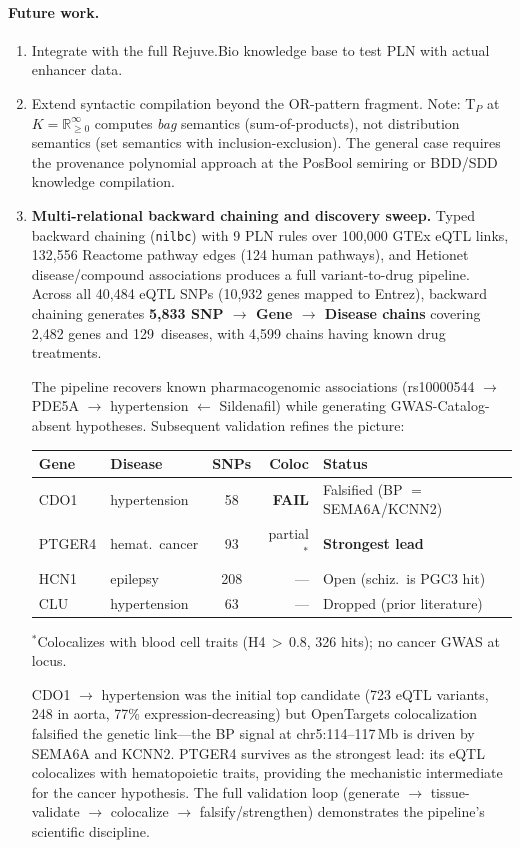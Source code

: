 \documentclass[]{article}
\newcommand{\code}[1]{\texttt{#1}}
\begin{document}
\paragraph{Future work.}
\begin{enumerate}
\item Integrate with the full Rejuve.Bio knowledge base to test PLN with actual
  enhancer data.
\item Extend syntactic compilation beyond the OR-pattern fragment.  Note:
  T$_P$ at $K = \mathbb{R}_{\ge 0}^{\infty}$ computes \emph{bag} semantics
  (sum-of-products), not distribution semantics (set semantics with inclusion-exclusion).
  The general case requires the provenance polynomial approach at the PosBool semiring
  or BDD/SDD knowledge compilation.
\item \textbf{Multi-relational backward chaining and discovery sweep.}
  Typed backward chaining (\code{nilbc}) with 9 PLN rules over
  100{,}000 GTEx eQTL links, 132{,}556 Reactome pathway edges
  (124 human pathways), and Hetionet~\cite{Himmelstein2017}
  disease/compound associations produces a full variant-to-drug
  pipeline.  Across all 40{,}484 eQTL SNPs (10{,}932 genes mapped
  to Entrez), backward chaining generates \textbf{5{,}833 SNP $\to$
  Gene $\to$ Disease chains} covering 2{,}482 genes and
  129~diseases, with 4{,}599 chains having known drug treatments.

  The pipeline recovers known pharmacogenomic associations
  (rs10000544 $\to$ PDE5A $\to$ hypertension $\leftarrow$
  Sildenafil) while generating GWAS-Catalog-absent hypotheses.
  Subsequent validation refines the picture:

  \begin{center}
  \small
  \begin{tabular}{llcrl}
  \toprule
  Gene & Disease & SNPs & Coloc & Status \\
  \midrule
  CDO1   & hypertension   & 58  & \textbf{FAIL} & Falsified (BP $=$ SEMA6A/KCNN2) \\
  PTGER4 & hemat.\ cancer & 93  & partial$^*$ & \textbf{Strongest lead} \\
  HCN1   & epilepsy       & 208 & ---  & Open (schiz.\ is PGC3 hit) \\
  CLU    & hypertension   & 63  & ---  & Dropped (prior literature) \\
  \bottomrule
  \end{tabular}
  \end{center}
  {\footnotesize $^*$Colocalizes with blood cell traits
  (H4\,$>$\,0.8, 326 hits); no cancer GWAS at locus.}

  \medskip\noindent
  CDO1 $\to$ hypertension was the initial top candidate (723
  eQTL variants, 248 in aorta, 77\% expression-decreasing) but
  OpenTargets colocalization falsified the genetic link---the BP
  signal at chr5:114--117\,Mb is driven by SEMA6A and KCNN2.
  PTGER4 survives as the strongest lead: its eQTL colocalizes
  with hematopoietic traits, providing the mechanistic
  intermediate for the cancer hypothesis.  The full validation
  loop (generate $\to$ tissue-validate $\to$ colocalize $\to$
  falsify/strengthen) demonstrates the pipeline's scientific
  discipline.
\end{enumerate}
\end{document}
